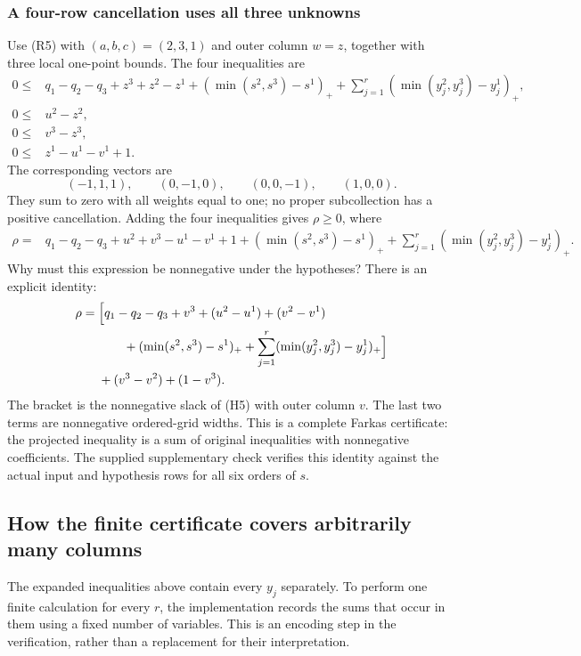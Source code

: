 \documentclass[a4paper,11pt]{amsart}
\numberwithin{equation}{section}
\theoremstyle{definition}
\theoremstyle{remark}
\begin{document}
\subsubsection{A four-row cancellation uses all three unknowns}
Use (R5) with $(a,b,c)=(2,3,1)$ and outer column $w=z$, together with three
local one-point bounds. The four inequalities are
\begin{align*}
0\le{}&q_1-q_2-q_3+z^3+z^2-z^1
 +(\min(s^2,s^3)-s^1)_+
 +\sum_{j=1}^r(\min(y_j^2,y_j^3)-y_j^1)_+,\\
0\le{}&u^2-z^2,\\
0\le{}&v^3-z^3,\\
0\le{}&z^1-u^1-v^1+1.
\end{align*}
The corresponding vectors are
\[
 (-1,1,1),\qquad(0,-1,0),\qquad(0,0,-1),\qquad(1,0,0).
\]
They sum to zero with all weights equal to one; no proper subcollection has
a positive cancellation. Adding the four inequalities gives $\rho\ge0$, where
\begin{align*}
\rho={}&q_1-q_2-q_3+u^2+v^3-u^1-v^1+1
 +(\min(s^2,s^3)-s^1)_++\sum_{j=1}^r(\min(y_j^2,y_j^3)-y_j^1)_+.
\end{align*}
Why must this expression be nonnegative under the hypotheses? There is an
explicit identity:
\begin{align*}
\rho={}&\Bigl[q_1-q_2-q_3+v^3+(u^2-u^1)+(v^2-v^1)\\
 &\qquad +(\min(s^2,s^3)-s^1)_+
 +\sum_{j=1}^r(\min(y_j^2,y_j^3)-y_j^1)_+\Bigr]\\
 &+(v^3-v^2)+(1-v^3).
\end{align*}
The bracket is the nonnegative slack of (H5) with outer column $v$.
The last two terms are nonnegative ordered-grid widths. This is a complete
Farkas certificate: the projected inequality is a sum of original
inequalities with nonnegative coefficients. The supplied supplementary
check verifies this identity against the actual input and hypothesis rows
for all six orders of $s$.

\subsection{How the finite certificate covers arbitrarily many columns}
The expanded inequalities above contain every $y_j$ separately. To perform
one finite calculation for every $r$, the implementation records the sums
that occur in them using a fixed number of variables. This is an encoding
step in the verification, rather than a replacement for their interpretation.
\end{document}
